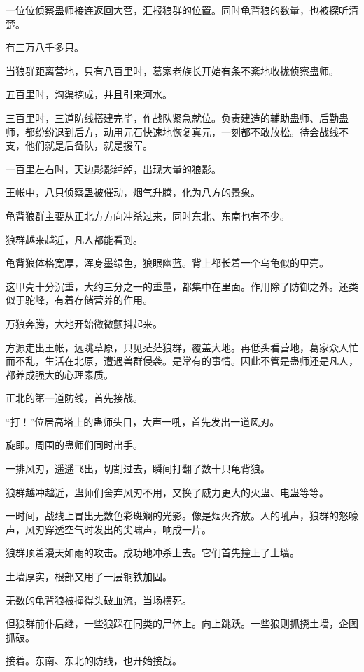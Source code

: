 \begin{this_body}
一位位侦察蛊师接连返回大营，汇报狼群的位置。同时龟背狼的数量，也被探听清楚。

有三万八千多只。

当狼群距离营地，只有八百里时，葛家老族长开始有条不紊地收拢侦察蛊师。

五百里时，沟渠挖成，并且引来河水。

三百里时，三道防线搭建完毕，作战队紧急就位。负责建造的辅助蛊师、后勤蛊师，都纷纷退到后方，动用元石快速地恢复真元，一刻都不敢放松。待会战线不支，他们就是后备队，就是援军。

一百里左右时，天边影影绰绰，出现大量的狼影。

王帐中，八只侦察蛊被催动，烟气升腾，化为八方的景象。

龟背狼群主要从正北方方向冲杀过来，同时东北、东南也有不少。

狼群越来越近，凡人都能看到。

龟背狼体格宽厚，浑身墨绿色，狼眼幽蓝。背上都长着一个乌龟似的甲壳。

这甲壳十分沉重，大约三分之一的重量，都集中在里面。作用除了防御之外。还类似于驼峰，有着存储营养的作用。

万狼奔腾，大地开始微微颤抖起来。

方源走出王帐，远眺草原，只见茫茫狼群，覆盖大地。再低头看营地，葛家众人忙而不乱，生活在北原，遭遇兽群侵袭。是常有的事情。因此不管是蛊师还是凡人，都养成强大的心理素质。

正北的第一道防线，首先接战。

“打！”位居高塔上的蛊师头目，大声一吼，首先发出一道风刃。

旋即。周围的蛊师们同时出手。

一排风刃，遥遥飞出，切割过去，瞬间打翻了数十只龟背狼。

狼群越冲越近，蛊师们舍弃风刃不用，又换了威力更大的火蛊、电蛊等等。

一时间，战线上冒出无数色彩斑斓的光影。像是烟火齐放。人的吼声，狼群的怒嚎声，风刃穿透空气时发出的尖啸声，响成一片。

狼群顶着漫天如雨的攻击。成功地冲杀上去。它们首先撞上了土墙。

土墙厚实，根部又用了一层铜铁加固。

无数的龟背狼被撞得头破血流，当场横死。

但狼群前仆后继，一些狼踩在同类的尸体上。向上跳跃。一些狼则抓挠土墙，企图抓破。

接着。东南、东北的防线，也开始接战。


\end{this_body}
